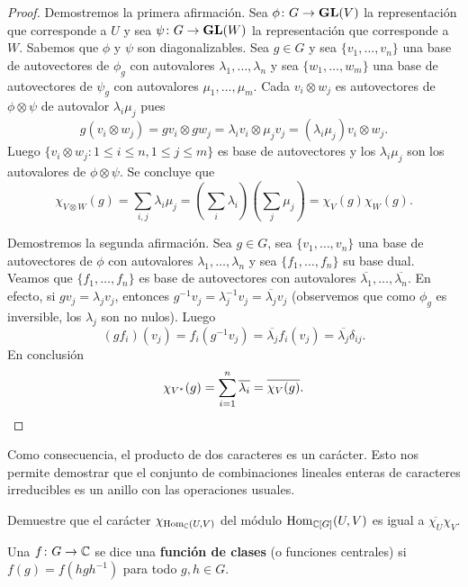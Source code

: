 \begin{proof}
	Demostremos la primera afirmación. Sea $\phi\colon G\to\mathbf{GL}(V)$ la representación que corresponde a $U$ y sea 
	$\psi\colon G\to\mathbf{GL}(W)$ la representación que corresponde a $W$.  
	Sabemos que $\phi$ y $\psi$ son diagonalizables. Sea $g\in G$ y sea $\{v_1,\dots,v_n\}$
	una base de autovectores de $\phi_g$ con autovalores
	$\lambda_1,\dots,\lambda_n$ y sea $\{w_1,\dots,w_m\}$ una base de
	autovectores de $\psi_g$ con autovalores $\mu_1,\dots,\mu_m$. Cada
	$v_i\otimes w_j$ es autovectores de $\phi\otimes\psi$ de autovalor
	$\lambda_i\mu_j$ pues 
	\[
		g(v_i\otimes w_j)=gv_i\otimes gw_j=\lambda_iv_i\otimes \mu_jv_j=(\lambda_i\mu_j)v_i\otimes w_j.
	\]
	Luego 
	$\{v_i\otimes w_j:1\leq i\leq n,1\leq j\leq m\}$ es base de autovectores y
	los $\lambda_i\mu_j$ son los autovalores de $\phi\otimes\psi$. Se concluye que
	\[
	\chi_{V\otimes W}(g)=\sum_{i,j}\lambda_i\mu_j=(\sum_i\lambda_i)(\sum_j\mu_j)=\chi_V(g)\chi_W(g).
	\]

	Demostremos la segunda afirmación. Sea $g\in G$, sea $\{v_1,\dots,v_n\}$
	una base de autovectores de $\phi$ con autovalores
	$\lambda_1,\dots,\lambda_n$ y sea $\{f_1,\dots,f_n\}$ su base dual. Veamos que $\{f_1,\dots,f_n\}$ es base de autovectores
	con autovalores $\overline{\lambda_1},\dots,\overline{\lambda_n}$. En efecto, si $gv_j=\lambda_jv_j$, entonces
	$g^{-1}v_j=\lambda_j^{-1}v_j=\overline{\lambda_j}v_j$ (observemos que como $\phi_g$ es inversible, los $\lambda_j$ son no nulos). Luego
	\[
		(gf_i)(v_j)=f_i(g^{-1}v_j)=\overline{\lambda_j}f_i(v_j)=\overline{\lambda_j}\delta_{ij}.
	\]
	En conclusión
	\[
		\chi_{V^*}(g)=\sum_{i=1}^n\overline{\lambda_i}=\overline{\chi_V(g)}.\qedhere
	\]
\end{proof}

Como consecuencia, el producto de dos caracteres es un carácter. 
Esto nos permite demostrar que 
el conjunto de combinaciones lineales enteras de caracteres 
irreducibles es un anillo con las operaciones usuales. 

\begin{exercise}
	Demuestre que el carácter $\chi_{\operatorname{Hom}_{\mathbb{C}}(U,V)}$ del módulo $\operatorname{Hom}_{\mathbb{C}[G]}(U,V)$ es igual a
	$\overline{\chi_U}\chi_V$.
\end{exercise}

\begin{definition}
  \label{exercise:cf(G)}
  Una $f\colon G\to\mathbb{C}$ se dice una \textbf{función de clases} (o funciones centrales) si
  $f(g)=f(hgh^{-1})$ para todo $g,h\in G$.  
\end{definition}

